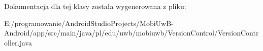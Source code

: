 Dokumentacja dla tej klasy została wygenerowana z pliku\+:\begin{DoxyCompactItemize}
\item 
E\+:/programowanie/\+Android\+Studio\+Projects/\+Mobi\+Uw\+B-\/\+Android/app/src/main/java/pl/edu/uwb/mobiuwb/\+Version\+Control/Version\+Controller.\+java\end{DoxyCompactItemize}
